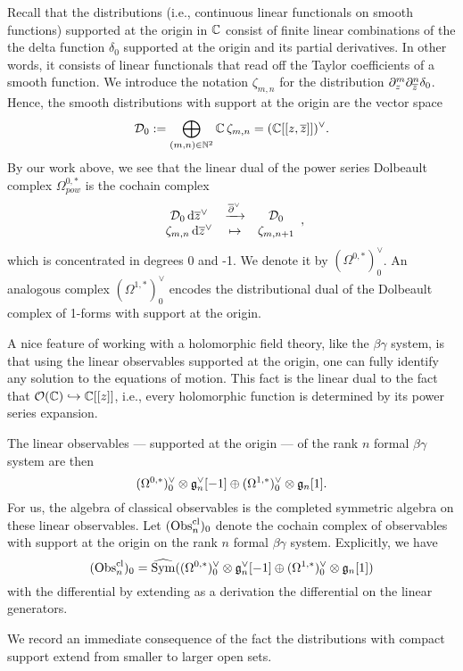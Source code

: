 Recall that the distributions (i.e., continuous linear functionals on smooth functions) 
supported at the origin in $\mathbb C$ consist of finite linear combinations of the the delta function $\delta_0$ 
supported at the origin and its partial derivatives.
In other words, it consists of linear functionals that read off the Taylor coefficients of a smooth function.
We introduce the notation $\zeta_{m,n}$ for the distribution $\partial_z^m \partial_{\overline{z}}^n \delta_0$.
Hence, the smooth distributions with support at the origin are the vector space
\[
\mathcal{D}_0 := \bigoplus_{(m,n) \in \mathbb N^2} \mathbb C\, \zeta_{m,n} = (\mathbb C[[z,\overline{z}]])^\vee.
\]
By our work above, we see that the linear dual of the power series Dolbeault complex $\Omega^{0,*}_{pow}$
is the cochain complex 
\[
\begin{array}{ccc}
\mathcal{D}_0 \,{\rm d}\overline{z}^\vee & \xrightarrow{\overline{\partial}^\vee} & \mathcal{D}_0 \\
\zeta_{m,n} \,{\rm d}\overline{z}^\vee & \mapsto & \zeta_{m,n+1}
\end{array},
\]
which is concentrated in degrees 0 and -1.
We denote it by $(\Omega^{0,*})^\vee_0$.
An analogous complex $(\Omega^{1,*})^\vee_0$ encodes 
the distributional dual of the Dolbeault complex of 1-forms with support at the origin.

\begin{rmk}
A nice feature of working with a holomorphic field theory, like the $\beta\gamma$ system,
is that using the linear observables supported at the origin,
one can fully identify any solution to the equations of motion.
This fact is the linear dual to the fact that $\mathcal O(\mathbb C) \hookrightarrow \mathbb C[[z]]$,
i.e., every holomorphic function is determined by its power series expansion.
\end{rmk}

The linear observables --- supported at the origin --- of the rank $n$ formal $\beta\gamma$ system are then
\[
(\Omega^{0,*})^\vee_0 \otimes \mathfrak{g}_n^\vee[-1] \oplus (\Omega^{1,*})^\vee_0 \otimes \mathfrak{g}_n[1].
\]
For us, the algebra of classical observables is the completed symmetric algebra on these linear observables.
Let $({\rm Obs}^{\rm cl}_n)_0$ denote the cochain complex of observables 
with support at the origin on the rank $n$ formal $\beta\gamma$ system.
Explicitly, we have
\[
({\rm Obs}^{\rm cl}_n)_0 = \widehat{{\rm Sym}}((\Omega^{0,*})^\vee_0 \otimes \mathfrak{g}_n^\vee[-1] \oplus (\Omega^{1,*})^\vee_0 \otimes \mathfrak{g}_n[1]) 
\]
with the differential by extending as a derivation the differential on the linear generators.

We record an immediate consequence of the fact the distributions with compact support extend from smaller to larger open sets.

